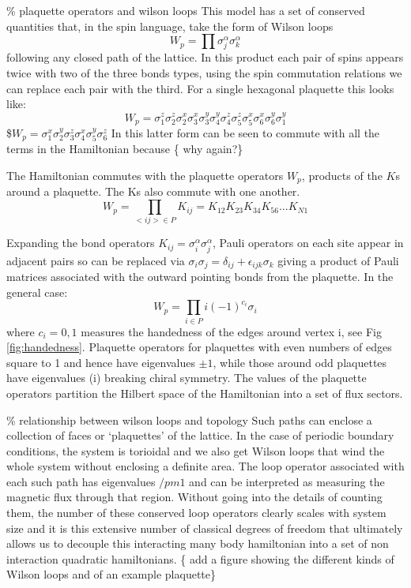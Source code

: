 \% plaquette operators and wilson loops This model has a set of
conserved quantities that, in the spin language, take the form of Wilson
loops \[W_p = \prod \sigma_j^{\alpha}\sigma_k^{\alpha}\] following any
closed path of the lattice. In this product each pair of spins appears
twice with two of the three bonds types, using the spin commutation
relations we can replace each pair with the third. For a single
hexagonal plaquette this looks like:
\[W_p = \sigma_1^{z}\sigma_2^{z} \sigma_2^{x}\sigma_3^{x} \sigma_3^{y}\sigma_4^{y} \sigma_4^{z}\sigma_5^{z} \sigma_5^{x}\sigma_6^{x} \sigma_6^{y}\sigma_1^{y}\]
\$\(W_p = \sigma_1^{x}\sigma_2^{y} \sigma_3^{z} \sigma_4^{x} \sigma_5^{y}\sigma_6^{z}\)
In this latter form can be seen to commute with all the terms in the
Hamiltonian because \{\color{red} why again?\}

The Hamiltonian commutes with the plaquette operators \(W_p\), products
of the \(K\)s around a plaquette. The Ks also commute with one another.
\[W_p = \prod_{<ij> \in P} K_{ij} = K_{12}K_{23}K_{34}K_{56} ... K_{N1}\]

Expanding the bond operators
\(K_{ij} = \sigma_i^{\alpha} \sigma_j^{\alpha}\), Pauli operators on
each site appear in adjacent pairs so can be replaced via
\(\sigma_i \sigma_j = \delta_{ij} + \epsilon_{ijk} \sigma_k\) giving a
product of Pauli matrices associated with the outward pointing bonds
from the plaquette. In the general case:
\[W_p = \prod_{i \in P} i (-1)^{c_i} \sigma_i\] where \(c_i = 0,1\)
measures the handedness of the edges around vertex i, see Fig
\ref{fig:handedness}. Plaquette operators for plaquettes with even
numbers of edges square to 1 and hence have eigenvalues \(\pm 1\), while
those around odd plaquettes have eigenvalues (\pm i) breaking chiral
symmetry. The values of the plaquette operators partition the Hilbert
space of the Hamiltonian into a set of flux sectors.

\% relationship between wilson loops and topology Such paths can enclose
a collection of faces or `plaquettes' of the lattice. In the case of
periodic boundary conditions, the system is torioidal and we also get
Wilson loops that wind the whole system without enclosing a definite
area. The loop operator associated with each such path has eigenvalues
\(/pm 1\) and can be interpreted as measuring the magnetic flux through
that region. Without going into the details of counting them, the number
of these conserved loop operators clearly scales with system size and it
is this extensive number of classical degrees of freedom that ultimately
allows us to decouple this interacting many body hamiltonian into a set
of non interaction quadratic hamiltonians. \{\color{red} add a figure
showing the different kinds of Wilson loops and of an example
plaquette\}

